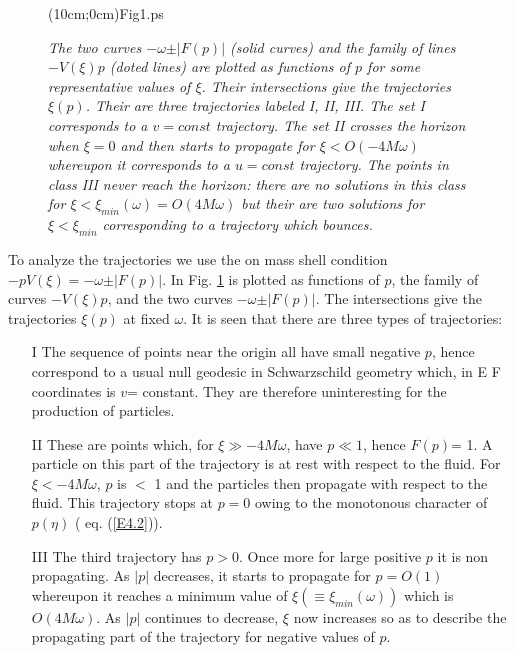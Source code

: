 \documentclass[12pt]{article}
\newcommand{\figprov}[4]{
\begin{figure}[hbt]
\begin{center}\mbox{\psboxto(#1;0cm){#4}}\end{center}
\caption{\it #3}
\label{#2}
\end{figure}
}
\begin{document}
\figprov{10cm}{UFig1}{The two curves $-\omega \pm \vert F(p)\vert$  (solid
curves) and the family of lines $-V(\xi) p$ (doted lines) are plotted as
functions of $p$ for some representative values of $\xi$. Their intersections
give the trajectories $\xi(p)$. Their are three trajectories labeled I, II,
III. The set I corresponds to a $v=const$ trajectory. The set II crosses the
horizon when $\xi =0$ and then starts to propagate for $\xi < O(-4 M
\omega)$ whereupon it corresponds to a $u=const$ trajectory. The points in
class III never reach the horizon: there are no solutions in this class
for $\xi < \xi_{min}(\omega)=O(4 M \omega)$ but their are two solutions for
$\xi < \xi_{min}$ corresponding to a trajectory which bounces. 
}{Fig1.ps}

To analyze the trajectories we use the on mass shell condition
$-pV(\xi) = -\omega \pm \vert F(p)\vert$. In Fig.
\ref{UFig1} is plotted as functions of $p$, the family of curves $-V
(\xi) p$, and the two curves $ -\omega \pm \vert F(p) \vert $. The intersections
give the trajectories $ \xi (p)$ at fixed $ \omega$. It is seen that there are
three types of trajectories:



\begin{itemize}
\item[I] The sequence of points near the origin all have small negative
$p$, hence correspond to a usual null geodesic in Schwarzschild geometry which,
in E F coordinates is $v$= constant. They are therefore uninteresting for the
production of particles. 

\item[II] These are points which, for $ \xi \gg - 4 M \omega$, have $ p \ll 1$,
hence $ F(p)$= 1. A particle on this part of the trajectory is at rest
with respect to the fluid. For $ \xi < - 4 M \omega$, $p$ is $<$ 1 and the
particles then propagate with respect to the fluid. This trajectory stops at $
p = 0$ owing to the monotonous character of $ p(\eta)$ ( eq. (\ref {E4.2})).


\item[III] The third trajectory has $ p > 0$. Once more for large positive $p$
it is non propagating. As $ \vert p \vert$ decreases, it starts to propagate for
$ p = O(1)$ whereupon it reaches a minimum value of $ \xi ( \equiv \xi_{min}
(\omega)) $ which is $ O ( 4 M \omega)$. As $ \vert p \vert$ continues to
decrease, $ \xi$ now increases so as to describe the propagating part of the
trajectory for negative values of $p$. 
\end{itemize}
\end{document}

